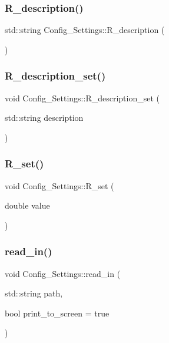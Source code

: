 \subsubsection{\texorpdfstring{R\+\_\+description()}{R\_description()}}
{\footnotesize\ttfamily std\+::string Config\+\_\+\+Settings\+::\+R\+\_\+description (\begin{DoxyParamCaption}{ }\end{DoxyParamCaption})}

\mbox{\label{class_config___settings_a14ced9f9c6df3c24b96cbb91be6314ec}} 
\subsubsection{\texorpdfstring{R\+\_\+description\+\_\+set()}{R\_description\_set()}}
{\footnotesize\ttfamily void Config\+\_\+\+Settings\+::\+R\+\_\+description\+\_\+set (\begin{DoxyParamCaption}\item[{std\+::string}]{description }\end{DoxyParamCaption})}

\mbox{\label{class_config___settings_ac91047810edd5c7ca6879a4ec3b27530}} 
\subsubsection{\texorpdfstring{R\+\_\+set()}{R\_set()}}
{\footnotesize\ttfamily void Config\+\_\+\+Settings\+::\+R\+\_\+set (\begin{DoxyParamCaption}\item[{double}]{value }\end{DoxyParamCaption})}

\mbox{\label{class_config___settings_a5896509ff0479fc36acc1319d6ada608}} 
\subsubsection{\texorpdfstring{read\+\_\+in()}{read\_in()}}
{\footnotesize\ttfamily void Config\+\_\+\+Settings\+::read\+\_\+in (\begin{DoxyParamCaption}\item[{std\+::string}]{path,  }\item[{bool}]{print\+\_\+to\+\_\+screen = {\ttfamily true} }\end{DoxyParamCaption})}

